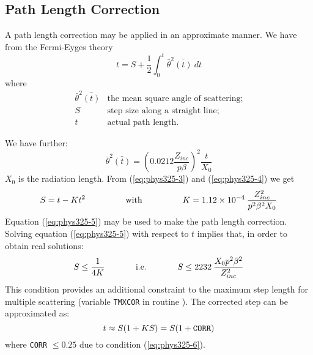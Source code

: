 \subsection{Path Length Correction}
 
A path length correction may be applied in an approximate manner.
We have from the Fermi-Eyges theory \cite{bib-EGS4}
\begin{equation}
\label{eq:phys325-3}
t = S + \frac{1}{2}\int_{0}^{t}{\bar{\theta}^{2}\bar{(t)} \: dt}
\end{equation}
where
\[
\begin{array}{LL}
\bar{\theta}^2\bar{(t)}  & \mbox{the mean square angle of scattering;} \\
S                     & \mbox{step size along a straight line;} \\
t                      & \mbox{actual path length.}
\end{array}
\]
 
We have further:
\begin{equation}
\label{eq:phys325-4}
\bar{\theta}^2\bar{(t)} = \left( 0.0212 \frac{Z_{inc}}{p\beta} \right)^2
\frac{t}{X_0}
\end{equation}
$X_0$ is the radiation length. From (\ref{eq:phys325-3}) and 
(\ref{eq:phys325-4}) we get
\begin{equation}
\label{eq:phys325-5}
S = t - K t^2
\makebox[4cm]{with}
K = 1.12 \times 10^{-4} \: \frac{Z_{inc}^2}{p^2\beta^2X_0}
\end{equation}
Equation (\ref{eq:phys325-5}) 
may be used to make the path length correction. Solving equation
(\ref{eq:phys325-5}) with respect to $t$ implies that, in order to
obtain real solutions:
\begin{equation}
\label{eq:phys325-6}
S \leq \frac{1}{4K} \makebox[3cm]{i.e.} S \leq 2232 \:
\frac{X_0 p^2 \beta^2}{Z_{inc}^2}
\end{equation}
This condition provides an additional constraint to the maximum step
length for multiple scattering (variable {\tt TMXCOR} in routine ).
The corrected step can be approximated as:
\[
t \approx S(1 + KS) = S ( 1 + \mbox{\tt CORR} )
\]
where {\tt CORR} $ \leq 0.25$ due to condition (\ref{eq:phys325-6}).
